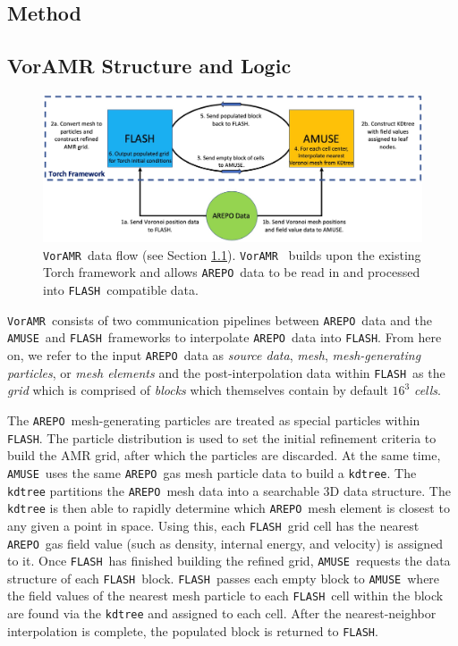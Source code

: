 \documentclass[twoside]{drexel-thesis}
\newcommand\voramr{\texttt{VorAMR}}
\newcommand\flash{\texttt{FLASH}}
\newcommand\amuse{\texttt{AMUSE}}
\newcommand\arepo{\texttt{AREPO}}
\begin{document}
\begin{thesis}
\section{Method}\label{sec:p2-method}
\subsection{VorAMR Structure and Logic}\label{sec:p2-struct_logic}
\begin{figure}[!htb]
    \centering
    \includegraphics[width=0.8\linewidth]{voramr-logic.png}
    \caption{\voramr~data flow (see Section \ref{sec:p2-struct_logic}). \voramr~ builds upon the existing Torch framework and allows \arepo~data to be read in and processed into \flash~compatible data.}
    \label{fig:logic}
\end{figure}

\voramr~consists of two communication pipelines between \arepo~data and the \amuse~and \flash~frameworks to interpolate \arepo~data into \flash.
From here on, we refer to the input \arepo~data as {\em source data}, {\em mesh}, {\em mesh-generating particles}, or {\em mesh elements} and the post-interpolation data within \flash~as the {\em grid} which is comprised of {\em blocks} which themselves contain by default $16^3$ {\em cells}. 

The \arepo~mesh-generating particles are treated as special particles within \flash. The particle distribution is used to set the initial refinement criteria to build the AMR grid, after which the particles are discarded. At the same time, \amuse~uses the same \arepo~gas mesh particle data to build a \texttt{kdtree}. The \texttt{kdtree} partitions the \arepo~mesh data into a searchable 3D data structure. The \texttt{kdtree} is then able to rapidly determine which \arepo~mesh element is closest to any given a point in space. Using this, each \flash~grid cell has the nearest \arepo~gas field value (such as density, internal energy, and velocity) is assigned to it. Once \flash~has finished building the refined grid, \amuse~requests the data structure of each \flash~block. \flash~passes each empty block to \amuse~where the field values of the nearest mesh particle to each \flash~cell within the block are found via the \texttt{kdtree} and assigned to each cell. After the nearest-neighbor interpolation is complete, the populated block is returned to \flash. 


\end{thesis}
\end{document}
